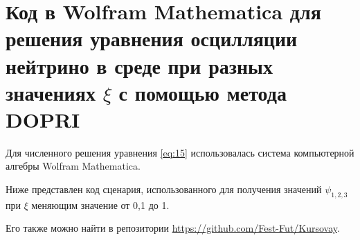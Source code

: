\section{Код в Wolfram Mathematica для решения уравнения осцилляции нейтрино в среде при разных значениях \(\xi\) с помощью метода DOPRI}
\label{app: code-python-vis}

Для численного решения уравнения \eqref{eq:15} использовалась система компьютерной алгебры \textsf{Wolfram Mathematica}. 


Ниже представлен код сценария, использованного для получения значений \(\psi_{1,2,3}\) при \(\xi\) меняющим значение от 0,1 до 1.

Его также можно найти в репозитории \url{https://github.com/Fest-Fut/Kursovay}.

\inputminted[linenos,breaklines,fontsize=\scriptsize]{Markdown}{Sun DOPRI.md}

